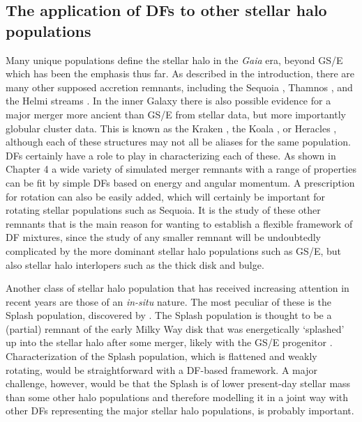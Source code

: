 \subsection{The application of DFs to other stellar halo populations}

Many unique populations define the stellar halo in the \textit{Gaia} era, beyond GS/E which has been the emphasis thus far. As described in the introduction, there are many other supposed accretion remnants, including the Sequoia \parencite{myeong19}, Thamnos \parencite{koppelman19b}, and the Helmi streams \parencite{helmi99,koppelman19a}. In the inner Galaxy there is also possible evidence for a major merger more ancient than GS/E from stellar data, but more importantly globular cluster data. This is known as the Kraken \parencite{kruijssen20}, the Koala \parencite{forbes20}, or Heracles \parencite{horta21a}, although each of these structures may not all be aliases for the same population. DFs certainly have a role to play in characterizing each of these. As shown in Chapter 4 a wide variety of simulated merger remnants with a range of properties can be fit by simple DFs based on energy and angular momentum. A prescription for rotation can also be easily added, which will certainly be important for rotating stellar populations such as Sequoia. It is the study of these other remnants that is the main reason for wanting to establish a flexible framework of DF mixtures, since the study of any smaller remnant will be undoubtedly complicated by the more dominant stellar halo populations such as GS/E, but also stellar halo interlopers such as the thick disk and bulge.

Another class of stellar halo population that has received increasing attention in recent years are those of an \textit{in-situ} nature. The most peculiar of these is the Splash population, discovered by \textcite{belokurov20}. The Splash population is thought to be a (partial) remnant of the early Milky Way disk that was energetically `splashed' up into the stellar halo after some merger, likely with the GS/E progenitor \parencite[although see][for a different hypothesis]{amarante20b}. Characterization of the Splash population, which is flattened and weakly rotating, would be straightforward with a DF-based framework. A major challenge, however, would be that the Splash is of lower present-day stellar mass than some other halo populations and therefore modelling it in a joint way with other DFs representing the major stellar halo populations, is probably important.

